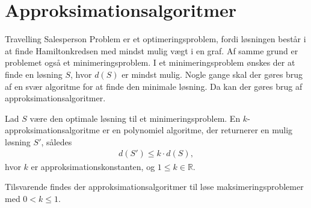 \section{Approksimationsalgoritmer}
Travelling Salesperson Problem er et optimeringsproblem, fordi løsningen består i at finde Hamiltonkredsen med mindst mulig vægt i en graf. 
Af samme grund er problemet også et minimeringsproblem. 
I et minimeringsproblem ønskes der at finde en løsning $S$, hvor $d(S)$ er mindst mulig.
Nogle gange skal der gøres brug af en svær algoritme for at finde den minimale løsning.
Da kan der gøres brug af approksimationsalgoritmer.

\begin{defn}\label{def:apk}
Lad $S$ være den optimale løsning til et minimeringsproblem. En $k$-approksimationsalgoritme er en polynomiel algoritme, der returnerer en mulig løsning $S'$, således
\begin{align*}
d(S') \leq k \cdot d(S),
\end{align*}
hvor $k$ er approksimationskonstanten, og $1 \leq k \in \mathbb{R}$.
\end{defn}

Tilsvarende findes der approksimationsalgoritmer til løse maksimeringsproblemer med $0 < k \leq 1$.
